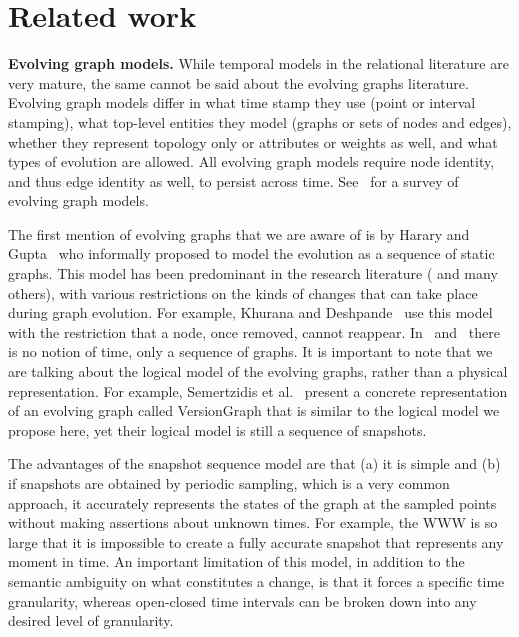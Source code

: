\section{Related work}
\label{sec:related}

{\bf Evolving graph models.}  While temporal models in the relational
literature are very mature, the same cannot be said about the evolving
graphs literature.  Evolving graph models differ in what time stamp
they use (point or interval stamping), what top-level entities they
model (graphs or sets of nodes and edges), whether they represent
topology only or attributes or weights as well, and what types of
evolution are allowed.  All evolving graph models require node
identity, and thus edge identity as well, to persist across time.
See~\cite{Zaki2016} for a survey of evolving graph models.

The first mention of evolving graphs that we are aware of is by Harary
and Gupta~\cite{Harary1997} who informally proposed to model the
evolution as a sequence of static graphs.  This model has been
predominant in the research literature
(\cite{Fard2012,Khurana2013,Ren2011} and many others), with various
restrictions on the kinds of changes that can take place during graph
evolution.  For example, Khurana and Deshpande~\cite{Khurana2013} use
this model with the restriction that a node, once removed, cannot
reappear.  In~\cite{Fard2012} and~\cite{Ren2011} there is no notion of
time, only a sequence of graphs.  It is important to note that we are talking about the
logical model of the evolving graphs, rather than a physical
representation.  For example, Semertzidis et
al.~\cite{Semertzidis2015} present a concrete representation of an
evolving graph called VersionGraph that is similar to the logical
model we propose here, yet their logical model is still a sequence of
snapshots.

The advantages of the snapshot sequence model are that (a) it is
simple and (b) if snapshots are obtained by periodic sampling, which
is a very common approach, it accurately represents the states of the
graph at the sampled points without making assertions about unknown
times.  For example, the WWW is so large that it is impossible to
create a fully accurate snapshot that represents any moment in time.
An important limitation of this model, in addition to the semantic
ambiguity on what constitutes a change, is that it forces a specific
time granularity, whereas open-closed time intervals can be broken
down into any desired level of granularity.

